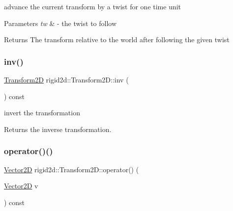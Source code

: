 advance the current transform by a twist for one time unit 


\begin{DoxyParams}{Parameters}
{\em tw} & -\/ the twist to follow \\
\hline
\end{DoxyParams}
\begin{DoxyReturn}{Returns}
The transform relative to the world after following the given twist 
\end{DoxyReturn}
\mbox{\label{classrigid2d_1_1Transform2D_a921bb5138fd83e48aaf75349dfd51653}} 
\subsubsection{\texorpdfstring{inv()}{inv()}}
{\footnotesize\ttfamily \hyperlink{classrigid2d_1_1Transform2D}{Transform2D} rigid2d\+::\+Transform2\+D\+::inv (\begin{DoxyParamCaption}{ }\end{DoxyParamCaption}) const}



invert the transformation 

\begin{DoxyReturn}{Returns}
the inverse transformation. 
\end{DoxyReturn}
\mbox{\label{classrigid2d_1_1Transform2D_aab68d8df21419767d4291e226e0a3481}} 
\subsubsection{\texorpdfstring{operator()()}{operator()()}\hspace{0.1cm}{\footnotesize\ttfamily [1/2]}}
{\footnotesize\ttfamily \hyperlink{structrigid2d_1_1Vector2D}{Vector2D} rigid2d\+::\+Transform2\+D\+::operator() (\begin{DoxyParamCaption}\item[{\hyperlink{structrigid2d_1_1Vector2D}{Vector2D}}]{v }\end{DoxyParamCaption}) const}



